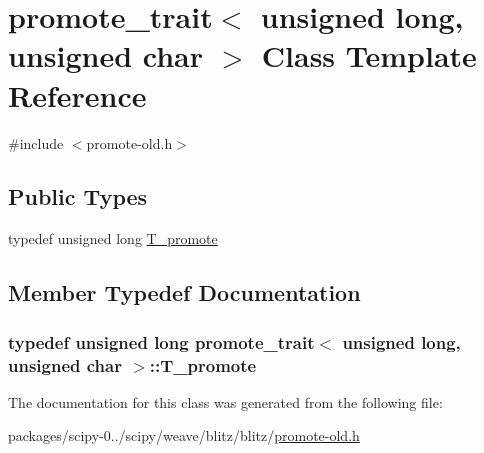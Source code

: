 \hypertarget{classpromote__trait_3_01unsigned_01long_00_01unsigned_01char_01_4}{}\section{promote\+\_\+trait$<$ unsigned long, unsigned char $>$ Class Template Reference}
\label{classpromote__trait_3_01unsigned_01long_00_01unsigned_01char_01_4}


{\ttfamily \#include $<$promote-\/old.\+h$>$}

\subsection*{Public Types}
\begin{DoxyCompactItemize}
\item 
typedef unsigned long \hyperlink{classpromote__trait_3_01unsigned_01long_00_01unsigned_01char_01_4_a4852057eda7b868391d28d328afe4584}{T\+\_\+promote}
\end{DoxyCompactItemize}


\subsection{Member Typedef Documentation}
\hypertarget{classpromote__trait_3_01unsigned_01long_00_01unsigned_01char_01_4_a4852057eda7b868391d28d328afe4584}{}
\subsubsection[{T\+\_\+promote}]{\setlength{\rightskip}{0pt plus 5cm}typedef unsigned long {\bf promote\+\_\+trait}$<$ unsigned long, unsigned char $>$\+::{\bf T\+\_\+promote}}\label{classpromote__trait_3_01unsigned_01long_00_01unsigned_01char_01_4_a4852057eda7b868391d28d328afe4584}


The documentation for this class was generated from the following file\+:\begin{DoxyCompactItemize}
\item 
packages/scipy-\/0../scipy/weave/blitz/blitz/\hyperlink{promote-old_8h}{promote-\/old.\+h}\end{DoxyCompactItemize}
